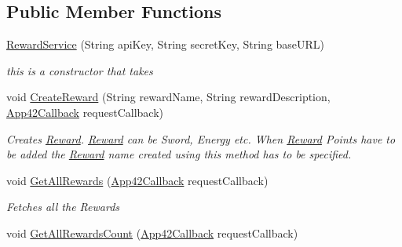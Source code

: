 \subsection*{Public Member Functions}
\begin{DoxyCompactItemize}
\item 
\hyperlink{classcom_1_1shephertz_1_1app42_1_1paas_1_1sdk_1_1windows_1_1reward_1_1_reward_service_a13fd55a20dbd832f2dec74a22e955f7a}{Reward\+Service} (String api\+Key, String secret\+Key, String base\+U\+R\+L)
\begin{DoxyCompactList}\small\item\em this is a constructor that takes \end{DoxyCompactList}\item 
void \hyperlink{classcom_1_1shephertz_1_1app42_1_1paas_1_1sdk_1_1windows_1_1reward_1_1_reward_service_aaaef8870a1fec008160a4ae8d7a3a2d9}{Create\+Reward} (String reward\+Name, String reward\+Description, \hyperlink{interfacecom_1_1shephertz_1_1app42_1_1paas_1_1sdk_1_1windows_1_1_app42_callback}{App42\+Callback} request\+Callback)
\begin{DoxyCompactList}\small\item\em Creates \hyperlink{classcom_1_1shephertz_1_1app42_1_1paas_1_1sdk_1_1windows_1_1reward_1_1_reward}{Reward}. \hyperlink{classcom_1_1shephertz_1_1app42_1_1paas_1_1sdk_1_1windows_1_1reward_1_1_reward}{Reward} can be Sword, Energy etc. When \hyperlink{classcom_1_1shephertz_1_1app42_1_1paas_1_1sdk_1_1windows_1_1reward_1_1_reward}{Reward} Points have to be added the \hyperlink{classcom_1_1shephertz_1_1app42_1_1paas_1_1sdk_1_1windows_1_1reward_1_1_reward}{Reward} name created using this method has to be specified. \end{DoxyCompactList}\item 
void \hyperlink{classcom_1_1shephertz_1_1app42_1_1paas_1_1sdk_1_1windows_1_1reward_1_1_reward_service_aa76d050365a7a93dcd3ef5275dec6680}{Get\+All\+Rewards} (\hyperlink{interfacecom_1_1shephertz_1_1app42_1_1paas_1_1sdk_1_1windows_1_1_app42_callback}{App42\+Callback} request\+Callback)
\begin{DoxyCompactList}\small\item\em Fetches all the Rewards \end{DoxyCompactList}\item 
void \hyperlink{classcom_1_1shephertz_1_1app42_1_1paas_1_1sdk_1_1windows_1_1reward_1_1_reward_service_ab2183b5532c0ab54a66549461b1eb837}{Get\+All\+Rewards\+Count} (\hyperlink{interfacecom_1_1shephertz_1_1app42_1_1paas_1_1sdk_1_1windows_1_1_app42_callback}{App42\+Callback} request\+Callback)

\end{DoxyCompactItemize}
